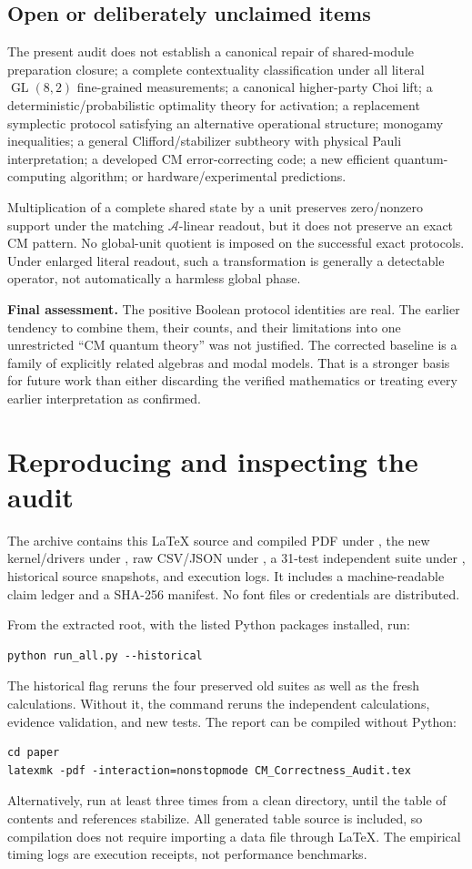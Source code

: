 \documentclass[11pt,a4paper]{article}
\theoremstyle{definition}\newtheorem{definition}[theorem]{Definition}
\newcommand{\A}{\mathcal A}
\newcommand{\GL}{\operatorname{GL}}
\newcommand{\file}[1]{\path{#1}}
\begin{document}
\subsection{Open or deliberately unclaimed items}
The present audit does not establish a canonical repair of shared-module preparation closure; a complete contextuality classification under all literal $\GL(8,2)$ fine-grained measurements; a canonical higher-party Choi lift; a deterministic/probabilistic optimality theory for activation; a replacement symplectic protocol satisfying an alternative operational structure; monogamy inequalities; a general Clifford/stabilizer subtheory with physical Pauli interpretation; a developed CM error-correcting code; a new efficient quantum-computing algorithm; or hardware/experimental predictions.

Multiplication of a complete shared state by a unit preserves zero/nonzero support under the matching $\A$-linear readout, but it does not preserve an exact CM pattern. No global-unit quotient is imposed on the successful exact protocols. Under enlarged literal readout, such a transformation is generally a detectable operator, not automatically a harmless global phase.

\textbf{Final assessment.} The positive Boolean protocol identities are real. The earlier tendency to combine them, their counts, and their limitations into one unrestricted ``CM quantum theory'' was not justified. The corrected baseline is a family of explicitly related algebras and modal models. That is a stronger basis for future work than either discarding the verified mathematics or treating every earlier interpretation as confirmed.

\appendix
\section{Reproducing and inspecting the audit}
The archive contains this LaTeX source and compiled PDF under \file{paper/}, the new kernel/drivers under \file{code/}, raw CSV/JSON under \file{data/}, a 31-test independent suite under \file{tests/}, historical source snapshots, and execution logs. It includes a machine-readable claim ledger and a SHA-256 manifest. No font files or credentials are distributed.

From the extracted root, with the listed Python packages installed, run:
\begin{verbatim}
python run_all.py --historical
\end{verbatim}
The historical flag reruns the four preserved old suites as well as the fresh calculations. Without it, the command reruns the independent calculations, evidence validation, and new tests. The report can be compiled without Python:
\begin{verbatim}
cd paper
latexmk -pdf -interaction=nonstopmode CM_Correctness_Audit.tex
\end{verbatim}
Alternatively, run \file{pdflatex} at least three times from a clean directory, until the table of contents and references stabilize. All generated table source is included, so compilation does not require importing a data file through LaTeX. The empirical timing logs are execution receipts, not performance benchmarks.
\end{document}
